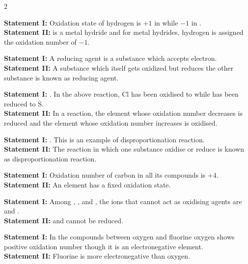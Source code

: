 \documentclass[10pt,a4paper]{article}
\begin{document}
\begin{multicols}{2}
\begin{questions}[start=21]

\item \textbf{Statement I:} Oxidation state of hydrogen is $+1$ in  while $-1$ in .\\
\textbf{Statement II:}  is a metal hydride and for metal hydrides, hydrogen is assigned the oxidation number of $-1$.

\item \textbf{Statement I:} A reducing agent is a substance which accepts electron.\\
\textbf{Statement II:} A substance which itself gets oxidized but reduces the other substance is known as reducing agent.

\item \textbf{Statement I:} . In the above reaction, Cl has been oxidised to  while  has been reduced to S.\\
\textbf{Statement II:} In a reaction, the element whose oxidation number decreases is reduced and the element whose oxidation number increases is oxidised.

\item \textbf{Statement I:} . This is an example of disproportionation reaction.\\
\textbf{Statement II:} The reaction in which one substance oxidise or reduce is known as disproportionation reaction.

\item \textbf{Statement I:} Oxidation number of carbon in all its compounds is $+4$.\\
\textbf{Statement II:} An element has a fixed oxidation state.

\item \textbf{Statement I:} Among , ,  and , the ions that cannot act as oxidising agents are  and .\\
\textbf{Statement II:}  and  cannot be reduced.

\item \textbf{Statement I:} In the compounds between oxygen and fluorine oxygen shows positive oxidation number though it is an electronegative element.\\
\textbf{Statement II:} Fluorine is more electronegative than oxygen.

\end{questions}
\end{multicols}
\end{document}
